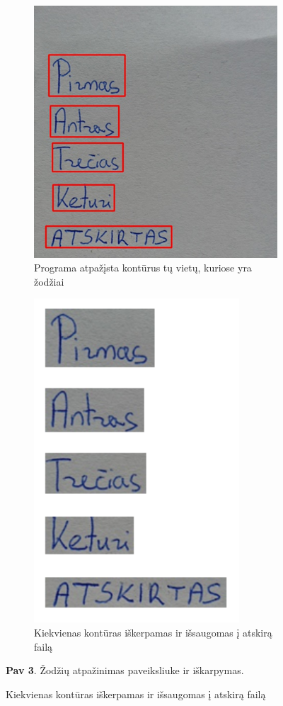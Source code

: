 \documentclass[a4paper,12pt]{article}
\begin{document}
\begin{figure}[H]
\centering
\begin{subfigure}{.5\textwidth}
  \centering
  \includegraphics[height=.9\linewidth]{img/3.1.png}
  \caption{Programa atpažįsta kontūrus tų vietų, kuriose yra žodžiai}
\end{subfigure}%
\begin{subfigure}{.5\textwidth}
  \centering
  \includegraphics[height=.9\linewidth]{img/3.2.png}
  \caption{Kiekvienas kontūras iškerpamas ir išsaugomas į atskirą failą}
\end{subfigure}
\textbf{Pav 3}. Žodžių atpažinimas paveiksliuke ir iškarpymas.\\
\end{figure}
\end{document}
